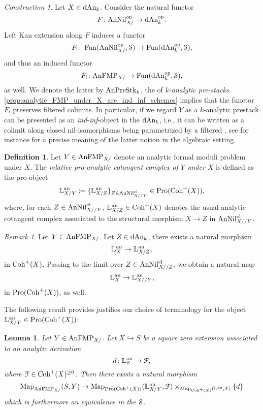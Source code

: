 \documentclass[10pt,a4paper,reqno]{amsart} %
\theoremstyle{plain}
\newtheorem{lem}[thm]{Lemma}
\theoremstyle{definition}
\newtheorem{defin}[thm]{Definition}
\theoremstyle{remark}
\newtheorem{rem}[thm]{Remark}
\numberwithin{equation}{section}
\newtheorem{construction}[thm]{Construction}
\begin{document}
\begin{construction}\label{const:anFMP_as_ind_inf_schemes} Let $X \in \mathrm{dAn}_k$. Consider the natural functor
    \[
        F \colon \mathrm{AnNil}_{X/} ^\mathrm{op} \to \mathrm{dAn}_k ^\mathrm{op}.
    \]
Left Kan extension along $F$ induces a functor
    \[
        F_! \colon \operatorname{Fun}( \mathrm{AnNil}_{X/ }^\mathrm{op}, \mathcal S) \to \operatorname{Fun}  (\mathrm{dAn}_k^\mathrm{op}, \mathcal S),
    \]
and thus an induced functor
    \[
        F_! \colon \mathrm{AnFMP}_{X/} \to \operatorname{Fun}(\mathrm{dAn}_k^\mathrm{op}, \mathcal S),
    \]
as well. We denote the latter \infcat by $\mathrm{AnPreStk}_k$, the \infcat
of \emph{$k$-analytic pre-stacks}. \cref{prop:analytic_FMP_under_X_are_ind_inf_schemes} implies that the functor $F_!$ preserves filtered colimits.
In particular, if we regard $Y$ as a $k$-analytic prestack can be presented
as an \emph{ind}-\emph{inf}-object in the \infcat $\mathrm{dAn}_k$, i.e., it can be written as a colimit along closed nil-isomorphisms
being parametrized by a filtered \infcat, see for instance \cite{Gaitsgory_Study_II} for a precise meaning
of the latter notion in the algebraic setting.
\end{construction}


\begin{defin}
    Let $Y \in \mathrm{AnFMP}_{X/}$ denote an analytic formal moduli problem under $X$. The \emph{relative pro-analytic cotangent complex of $Y$ under $X$} is defined as the pro-object
        \[
            \mathbb L^\mathrm{an}_{X/Y} \coloneqq \{ \mathbb L^\mathrm{an}_{X/Z} \}_{Z \in \mathrm{AnNil}^{\mathrm{cl}}_{X//Y}}  \in \mathrm{Pro}(\mathrm{Coh}^+(X)),
        \]
    where, for each $Z \in \mathrm{AnNil}^{\mathrm{cl}}_{X//Y}$, $\mathbb L^\mathrm{an}_{X/Z} \in \mathrm{Coh}^+(X)$ denotes the usual analytic cotangent complex associated to
    the structural morphism $X \to Z$ in $\mathrm{AnNil}^{\mathrm{cl}}_{X//Y}$.
\end{defin}

\begin{rem}
    Let $Y \in \mathrm{AnFMP}_{X/}$. Let $Z \in \mathrm{dAn}_k$, there exists a natural morphism
        \[
            \mathbb L^\mathrm{an}_X \to \mathbb L^\mathrm{an}_{X/Z} ,  
        \]
    in $\mathrm{Coh}^+(X)$. Passing to the limit over $Z \in \mathrm{AnNil}^{\mathrm{cl}}_{X//Z}$, we obtain a natural map
        \[
            \mathbb L^\mathrm{an}_X \to \mathbb L^\mathrm{an}_{X//Y},  
        \]
    in $\mathrm{Pro}(\mathrm{Coh}^+(X))$, as well.
\end{rem}

The following result provides justifies our choice of terminology for the object $\mathbb L^\mathrm{an}_{X/Y} \in \mathrm{Pro}(\mathrm{Coh}^+(X))$:

\begin{lem} \label{lem:pro_cot_complex_classifies_nil_extensions_for_analytic_moduli_problems}
    Let $Y \in \mathrm{AnFMP}_{X/}$. Let $X \hookrightarrow S$ be a square zero extension associated to an analytic derivation
        \[
            d \colon \mathbb L^\mathrm{an}_S \to \mathcal F ,  
        \]
    where $\mathcal F \in \mathrm{Coh}^+(X)^{\ge 0}$. Then there exists a natural morphism
        \[
            \operatorname{Map}_{\mathrm{AnFMP}_{X/}}(S, Y) \to \operatorname{Map}_{\mathrm{Pro}(\mathrm{Coh}^+(X))}(\mathbb L^\mathrm{an}_{X/Y}, \mathcal F) \times_{\operatorname{Map}_{\mathrm{Coh}^+(X)}(\mathbb L^\mathrm{an}, \mathcal F)} \{ d \}
        \]
    which is furthermore an equivalence in the \infcat $\mathcal S$.
\end{lem}
\end{document}
